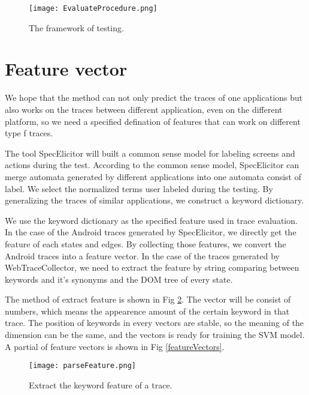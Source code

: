 \begin{figure}[ht]
	\graphicspath{{pic/}}
	\begin{center}
		\texttt{[image: EvaluateProcedure.png]}
	\end{center}
	\caption{ The framework of testing. }
	\label{EvaluateProcedure}
\end{figure}

\section{Feature vector}

We hope that the method can not only predict the traces of one applications 
but also works on the traces between different application, even on the different platform,
so we need a specified defination of features that can work on different type f traces.

The tool SpecElicitor will built a common sense model for labeling screens and actions during the test.
According to the common sense model, 
SpecElicitor can merge automata generated by different applications into one automata consist of label.
We select the normalized terms user labeled during the testing.
By generalizing the traces of similar applications, we construct a keyword dictionary.

We use the keyword dictionary as the specified feature used in trace evaluation.
In the case of the Android traces generated by SpecElicitor,
we directly get the feature of each states and edges.
By collecting those features, we convert the Android traces into a feature vector.
In the case of the traces generated by WebTraceCollector,
we need to extract the feature by string comparing between keywords and it's synonyms and the DOM tree of every state.

The method of extract feature is shown in Fig \ref{parseFeature}.
The vector will be consist of numbers, which means the appearence amount of the certain keyword in that trace.
The position of keywords in every vectors are stable,
so the meaning of the dimension can be the same, 
and the vectors is ready for training the SVM model.
A partial of feature vectors is shown in Fig \ref{featureVectors}.


\begin{figure}[ht]
	\graphicspath{{pic/}}
	\begin{center}
		\texttt{[image: parseFeature.png]}
	\end{center}
	\caption{ Extract the keyword feature of a trace. }
	\label{parseFeature}
\end{figure}

